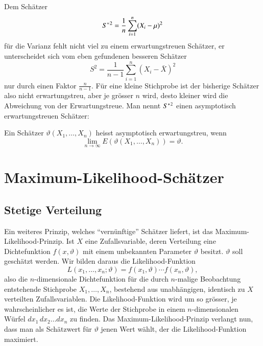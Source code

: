 Dem Schätzer
\begin{equation}
S^{*}\mathstrut^{2}=\frac1n\sum_{i=1}^n(X_i-\mu)^2
\end{equation}
für die Varianz fehlt nicht viel zu einem erwartungstreuen Schätzer,
er unterscheidet sich vom eben gefundenen besseren Schätzer
\begin{equation}
S^2=\frac1{n-1}\sum_{i=1}^n(X_i-\bar X)^2
\end{equation}
nur durch einen Faktor $\frac{n}{n-1}$.
Für eine kleine Stichprobe ist
der bisherige Schätzer also nicht erwartungstreu, aber je grösser $n$
wird, desto kleiner wird die Abweichung von der Erwartungstreue.
Man
nennt $S^{*}\mathstrut^{2}$ einen asymptotisch erwartungstreuen Schätzer:
\begin{definition}
Ein Schätzer $\vartheta(X_1,\dots,X_n)$ heisst asymptotisch erwartungstreu,
wenn
\begin{equation}
\lim_{n\to\infty}E(\vartheta(X_1,\dots,X_n))=\vartheta.
\end{equation}
\end{definition}

\section{Maximum-Likelihood-Schätzer} \label{section-maximum-likelihood-schaetzer}
\subsection{Stetige Verteilung}
Ein weiteres Prinzip, welches ``vernünftige'' Schätzer liefert,
ist das Maximum-Likelihood-Prinzip.
Ist $X$ eine Zufallsvariable, deren
Verteilung eine Dichtefunktion $f(x,\vartheta)$ mit einem unbekannten
Parameter $\vartheta$ besitzt. $\vartheta$ soll geschätzt werden.
Wir bilden daraus die Likelihood-Funktion
\begin{equation}
L(x_1,\dots,x_n;\vartheta)=f(x_1,\vartheta)\cdots f(x_n,\vartheta),
\label{likelihood-funktion}
\end{equation}
also die $n$-dimensionale Dichtefunktion für die durch $n$-malige 
Beobachtung entstehende Stichprobe $X_1,\dots,X_n$, bestehend aus
unabhängigen, identisch zu $X$ verteilten Zufallsvariablen.
Die Likelihood-Funktion wird um so grösser, je wahrscheinlicher
es ist, die Werte der Stichprobe in einem $n$-dimensionalen Würfel
$dx_1\,dx_2\dots dx_n$ zu finden.
Das Maximum-Likelihood-Prinzip
verlangt nun, dass man als Schätzwert für $\vartheta$ jenen Wert
wählt, der die Likelihood-Funktion maximiert.

